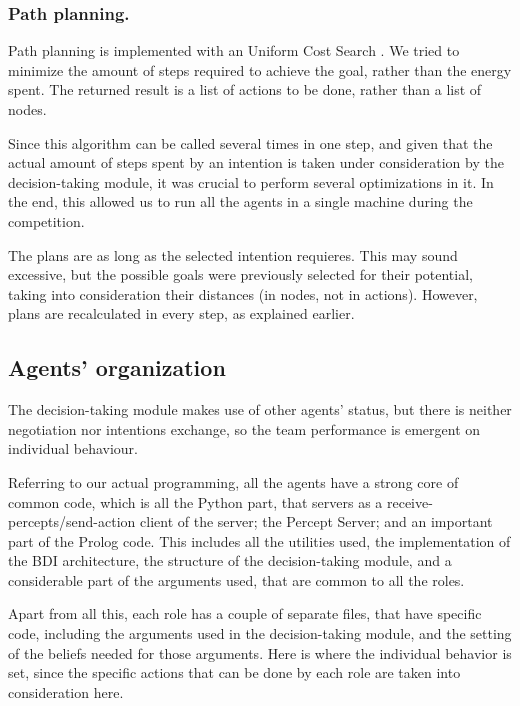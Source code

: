 \documentclass{llncs2e/llncs}
\begin{document}
\subsubsection{Path planning.}

    Path planning is implemented with an Uniform Cost Search
    \cite{Russell:2003:AIM:773294}.  We tried to minimize the amount of
    steps required to achieve the goal, rather than the energy spent.  The
    returned result is a list of actions to be done, rather than a list of
    nodes.
    
    Since this algorithm can be called several times in one step, and given that the 
    actual amount of steps spent by an intention is taken under consideration by 
    the decision-taking module, it was crucial to perform several optimizations in 
    it. In the end, this allowed us to run all the agents in a single machine  
    during the competition.
    
    The plans are as long as the selected intention requieres. This may 
    sound excessive, but the possible goals were previously selected for their 
    potential, taking into consideration their distances (in nodes, not in 
    actions). However, plans are recalculated in every step, as explained earlier.    

\subsection{Agents' organization}

    The decision-taking module makes use of other agents' status, but there is
    neither negotiation nor intentions exchange, so the team performance is
    emergent on individual behaviour.  
    
    Referring to our actual programming, all the agents have a strong core of
    common code, which is all the Python part, that servers as
    a receive-percepts/send-action client of the server; the Percept Server; and
    an important part of the Prolog code. This includes all the utilities used,
    the implementation of the BDI architecture, the structure of the
    decision-taking module, and a considerable part of the arguments used, that
    are common to all the roles.
        
    Apart from all this, each role has a couple of separate files, that have 
    specific code, including the arguments used in the decision-taking module, and
    the setting of the beliefs needed for those arguments. Here is where the 
    individual behavior is set, since the specific actions that can be done by each
    role are taken into consideration here.
    
\end{document}
